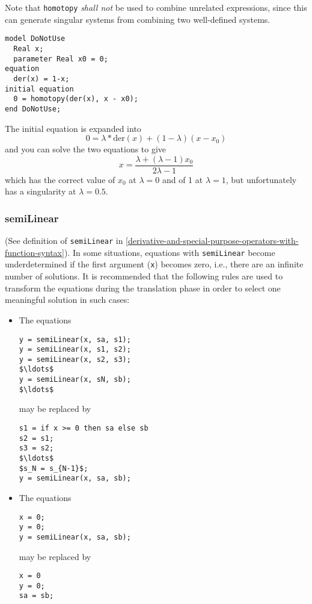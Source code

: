 \begin{example}[4] Note that \lstinline!homotopy! \emph{shall not} be used to combine unrelated expressions, since this can generate singular systems from combining two well-defined systems.
\begin{lstlisting}[language=modelica]
model DoNotUse
  Real x;
  parameter Real x0 = 0;
equation
  der(x) = 1-x;
initial equation
  0 = homotopy(der(x), x - x0);
end DoNotUse;
\end{lstlisting}

The initial equation is expanded into
\begin{equation*}
0 = \lambda*\mathrm{der}(x)+(1-\lambda)(x-x_0)
\end{equation*}
and you can solve the two equations to give
\begin{equation*}
x = \frac{\lambda+(\lambda-1)x_0}{2\lambda-1}
\end{equation*}
which has the correct value of $x_0$ at $\lambda = 0$ and of 1 at $\lambda = 1$, but unfortunately has a singularity at $\lambda = 0.5$.
\end{example}


\subsubsection{semiLinear}\label{semilinear}

(See definition of \lstinline!semiLinear! in \cref{derivative-and-special-purpose-operators-with-function-syntax}).
In some situations, equations with \lstinline!semiLinear! become underdetermined if the first argument (\lstinline!x!) becomes zero, i.e., there are an infinite number of solutions.
It is recommended that the following rules are used to transform the equations during the translation phase in order to select one meaningful solution in such cases:
\begin{itemize}
\item
The equations
\begin{lstlisting}[language=modelica]
y = semiLinear(x, sa, s1);
y = semiLinear(x, s1, s2);
y = semiLinear(x, s2, s3);
$\ldots$
y = semiLinear(x, sN, sb);
$\ldots$
\end{lstlisting}
may be replaced by
\begin{lstlisting}[language=modelica]
s1 = if x >= 0 then sa else sb
s2 = s1;
s3 = s2;
$\ldots$
$s_N = s_{N-1}$;
y = semiLinear(x, sa, sb);
\end{lstlisting}

\item
The equations
\begin{lstlisting}[language=modelica]
x = 0;
y = 0;
y = semiLinear(x, sa, sb);
\end{lstlisting}
may be replaced by
\begin{lstlisting}[language=modelica]
x = 0
y = 0;
sa = sb;
\end{lstlisting}
\end{itemize}

